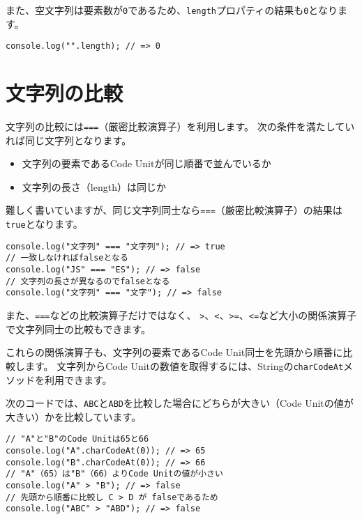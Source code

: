 また、空文字列は要素数が\texttt{0}であるため、\texttt{length}プロパティの結果も\texttt{0}となります。

\begin{lstlisting}
console.log("".length); // => 0
\end{lstlisting}

\hypertarget{compare}{%
\section{文字列の比較}\label{compare}}

文字列の比較には\texttt{===}（厳密比較演算子）を利用します。
次の条件を満たしていれば同じ文字列となります。

\begin{itemize}
\item
  文字列の要素であるCode Unitが同じ順番で並んでいるか
\item
  文字列の長さ（length）は同じか
\end{itemize}

難しく書いていますが、同じ文字列同士なら\texttt{===}（厳密比較演算子）の結果は\texttt{true}となります。

\begin{lstlisting}
console.log("文字列" === "文字列"); // => true
// 一致しなければfalseとなる
console.log("JS" === "ES"); // => false
// 文字列の長さが異なるのでfalseとなる
console.log("文字列" === "文字"); // => false
\end{lstlisting}

また、\texttt{===}などの比較演算子だけではなく、
\texttt{>}、\texttt{<}、\texttt{>=}、\texttt{<=}など大小の関係演算子で文字列同士の比較もできます。

これらの関係演算子も、文字列の要素であるCode
Unit同士を先頭から順番に比較します。 文字列からCode
Unitの数値を取得するには、Stringの\texttt{charCodeAt}メソッドを利用できます。

次のコードでは、\texttt{ABC}と\texttt{ABD}を比較した場合にどちらが大きい（Code
Unitの値が大きい）かを比較しています。

\begin{lstlisting}
// "A"と"B"のCode Unitは65と66
console.log("A".charCodeAt(0)); // => 65
console.log("B".charCodeAt(0)); // => 66
// "A"（65）は"B"（66）よりCode Unitの値が小さい
console.log("A" > "B"); // => false
// 先頭から順番に比較し C > D が falseであるため
console.log("ABC" > "ABD"); // => false
\end{lstlisting}

